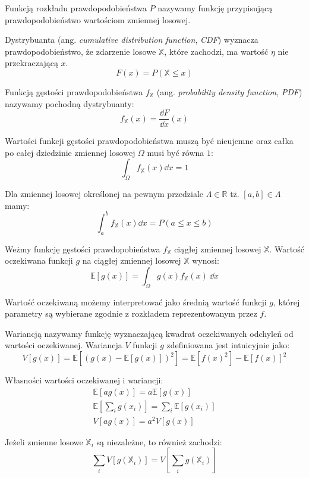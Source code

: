 \documentclass[../main.tex]{subfiles}
\begin{document}
Funkcją rozkładu prawdopodobieństwa $P$ nazywamy funkcję przypisującą prawdopodobieństwo wartościom zmiennej losowej. 

Dystrybuanta (ang. \textit{cumulative distribution function}, \textit{CDF})
wyznacza prawdopodobieństwo, że zdarzenie losowe $\mathbb{X}$, które zachodzi,
ma wartość $\eta$ nie przekraczającą $x$.
\[
    F(x) = P(\mathbb{X} \leq x)
\]

Funkcją gęstości prawdopodobieństwa $f_{\mathbb{X}}$ (ang. \textit{probability density
function}, \textit{PDF}) nazywamy pochodną dystrybuanty:
\[
    f_{\mathbb{X}}(x) = \frac{\dd F}{\dd x}(x)
\]

Wartości funkcji gęstości prawdopodobieństwa muszą być nieujemne oraz całka po całej dziedzinie zmiennej losowej $\Omega$ musi być równa $1$:
\[
    \int_{\Omega} f_{\mathbb{X}}(x) \dd x = 1
\]

Dla zmiennej losowej określonej na pewnym przedziale $\Lambda \in \mathbb{R}$ tż. $[a,b] \in \Lambda$ mamy:
\[
    \int_{a}^{b} f_{\mathbb{X}}(x) \dd x = P(a \leq x \leq b)
\]

Weżmy funkcję gęstości prawdopobieństwa $f_{\mathbb{X}}$ ciągłej zmiennej
losowej $\mathbb{X}$. Wartość oczekiwana funkcji $g$ na ciągłej zmiennej
losowej $\mathbb{X}$ wynosi:
\[
\mathbb{E}\left[ g(x) \right] =
\int_{\Omega}{
	g(x) f_{\mathbb{X}}(x)
	\: \dd x
}
\]

Wartość oczekiwaną możemy interpretować jako średnią wartość funkcji $g$, której parametry są wybierane zgodnie z rozkładem reprezentowanym przez $f$.

Wariancją nazywamy funkcję wyznaczającą kwadrat oczekiwanych odchyleń od wartości oczekiwanej. Wariancja $V$ funkcji $g$ zdefiniowana jest intuicyjnie jako:
\[
V\left[ g(x) \right] 
	=
	\mathbb{E}\left[ 
		\left( 
			g(x) - \mathbb{E}\left[ g(x) \right] 
		\right)^2 
	\right]
	=
	\mathbb{E}\left[
		f(x)^2
	\right] - \mathbb{E}\left[
		f(x)
	\right]^2
\]

Własności wartości oczekiwanej i wariancji:
\begin{gather*}
\mathbb{E}\left[ag(x)\right] = a \mathbb{E} \left[g(x)\right] \\
\mathbb{E}\left[\sum_{i} g(x_i)\right] = \sum_{i} \mathbb{E} \left[g(x_i)\right] \\
V\left[ ag(x) \right] = a^2 V\left[g(x)\right]
\end{gather*}

Jeżeli zmienne losowe $\mathbb{X}_i$ są niezależne, to również zachodzi:
\[
\sum_{i} V \left[
	g(\mathbb{X}_i)
\right]
=
V \left[
	\sum_{i} g(\mathbb{X}_i)
\right]
\]
\end{document}
